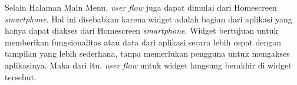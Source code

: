Selain Halaman Main Menu, \textit{user flow} juga dapat dimulai dari Homescreen \textit{smartphone}. Hal ini disebabkan karena widget adalah bagian dari aplikasi yang hanya dapat diakses dari Homescreen \textit{smartphone}. Widget bertujuan untuk memberikan fungsionalitas atau data dari aplikasi secara lebih cepat dengan tampilan yang lebih sederhana, tanpa memerlukan pengguna untuk mengakses aplikasinya. Maka dari itu, \textit{user flow} untuk widget langsung berakhir di widget tersebut.



  

